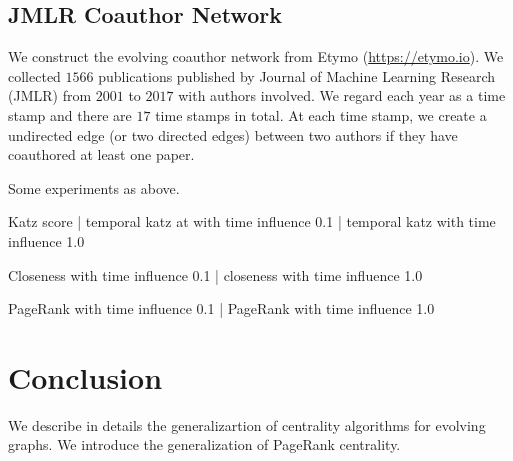 \documentclass[12pt]{article}
\theoremstyle{definition}
\begin{document}
\subsection{JMLR Coauthor Network}
\label{sec:jmlr-coauth-netw}

We construct the evolving coauthor network from Etymo (\url{https://etymo.io}).
We collected $1566$ publications published by Journal of Machine Learning Research (JMLR) from $2001$ to $2017$ with authors involved. We regard each year
as a time stamp and there are $17$ time stamps in total. At each time stamp, we
create a undirected edge (or two directed edges) between two authors if they have coauthored at least one paper.

Some experiments as above.

Katz score | temporal katz at with time influence 0.1 | temporal katz with time influence 1.0


Closeness with time influence 0.1 | closeness with time influence 1.0


PageRank with time influence 0.1 | PageRank with time influence 1.0



\section{Conclusion}
\label{sec:conclusion}

We describe in details the generalizartion of centrality algorithms for evolving graphs.
We introduce the generalization of PageRank centrality.



\end{document}
